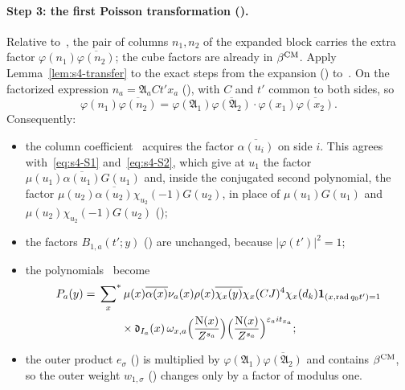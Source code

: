 \documentclass[11pt]{article}
\numberwithin{equation}{section}
\newcommand{\N}{\mathrm N}
\newcommand{\ind}{\mathbf1}
\newcommand{\ssum}{\sideset{}{^*}\sum}
\begin{document}
\paragraph{Step 3: the first Poisson transformation (\cite[proof of Lemma~17.2]{OAI78}).} Relative to~\cite{OAI78}, the pair of
columns $n_1,n_2$ of the expanded block carries the extra factor $\varphi(n_1)\overline{\varphi(n_2)}$; the cube
factors are already in $\beta^{\rm CM}$. Apply Lemma~\ref{lem:s4-transfer} to the exact steps from the expansion
(\cite[proof of Lemma~17.2, \emph{The first Poisson transformation}]{OAI78}) to~\cite[eq.~(17.31)]{OAI78}. On the factorized expression
$n_a=\mathfrak A_aCt'x_a$ (\cite[proof of Lemma~17.2, \emph{The first Poisson transformation}; proof of Lemma~17.2, \emph{Retaining the fourth-power label from the cubes}]{OAI78}), with $C$ and $t'$ common to both sides, so
\begin{equation}\label{eq:d174}
 \varphi(n_1)\overline{\varphi(n_2)}=\varphi(\mathfrak A_1)\overline{\varphi(\mathfrak A_2)}\cdot\varphi(x_1)\overline{\varphi(x_2)} .
\end{equation}
Consequently:
\begin{itemize}
\item the column coefficient~\cite[eq.~(C)]{OAI78} acquires the factor $\overline{\alpha(u_i)}$ on side
 $i$. This agrees with~\eqref{eq:s4-S1} and~\eqref{eq:s4-S2}, which give at $u_1$ the factor
 $\mu(u_1)\overline{\alpha(u_1)}G(u_1)$ and, inside the conjugated second polynomial, the factor
 $\mu(u_2)\overline{\alpha(u_2)}\chi_{u_2}(-1)G(u_2)$, in place of $\mu(u_1)G(u_1)$ and
 $\mu(u_2)\chi_{u_2}(-1)G(u_2)$ (\cite[proof of Lemma~17.2, \emph{The first Poisson transformation}]{OAI78});
\item the factors $B_{1,a}(t';y)$ (\cite[proof of Lemma~17.2, \emph{Separating the first transformed product}]{OAI78}) are unchanged, because $|\varphi(t')|^2=1$;
\item the polynomials~\cite[eq.~(17.30)]{OAI78} become
 \begin{equation}\label{eq:s4-Pa}
 \begin{split}
 P_a(y)={}&\ssum_x\mu(x)\overline{\alpha(x)}\nu_a(x)\rho(x)\overline{\chi_x(y)}\chi_x(CJ)^4\chi_x(d_k)
 \ind_{(x,\operatorname{rad}q_0t')=1}\\
 &\qquad\times\mathfrak d_{I_a}(x)\,\omega_{x,a}\Bigl(\frac{\N(x)}{Z^{s_a}}\Bigr)
 \Bigl(\frac{\N(x)}{Z^{s_a}}\Bigr)^{\varepsilon_ait_{x_a}};
 \end{split}
 \end{equation}
\item the outer product $e_\sigma$ (\cite[proof of Lemma~17.2, \emph{Separating the first transformed product}]{OAI78}) is multiplied by $\varphi(\mathfrak A_1)\overline{\varphi(\mathfrak A_2)}$
 and contains $\beta^{\rm CM}$, so the outer weight $w_{1,\sigma}$ (\cite[proof of Lemma~17.2, \emph{Separating the first transformed product}]{OAI78}) changes only by a factor of modulus one.
\end{itemize}
\end{document}
